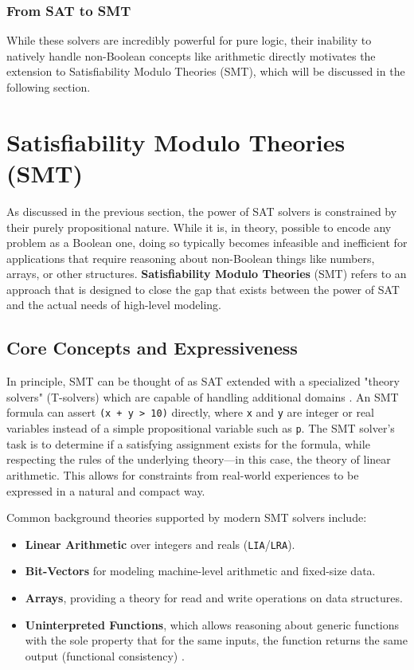 \documentclass[12pt, a4paper, oneside]{report} %
\begin{document}
\subsubsection{From SAT to SMT}
While these solvers are incredibly powerful for pure logic, their inability to natively handle non-Boolean concepts like arithmetic directly motivates the extension to Satisfiability Modulo Theories (SMT), which will be discussed in the following section.
\section{Satisfiability Modulo Theories (SMT)}
\label{sec:smt}

As discussed in the previous section, the power of SAT solvers is constrained by their purely propositional nature. While it is, in theory, possible to encode any problem as a Boolean one, doing so typically becomes infeasible and inefficient for applications that require reasoning about non-Boolean things like numbers, arrays, or other structures\cite{demoura2011smt}. \textbf{Satisfiability Modulo Theories} (SMT) refers to an approach that is designed to close the gap that exists between the power of SAT and the actual needs of high-level modeling.

\subsection{Core Concepts and Expressiveness}
In principle, SMT can be thought of as SAT extended with a specialized "theory solvers" (T-solvers) which are capable of handling additional domains \cite{Barrett2018_Handbook}. An SMT formula can assert \texttt{(x + y > 10)} directly, where \texttt{x} and \texttt{y} are integer or real variables instead of a simple propositional variable such as \texttt{p}. The SMT solver's task is to determine if a satisfying assignment exists for the formula, while respecting the rules of the underlying theory---in this case, the theory of linear arithmetic. This allows for constraints from real-world experiences to be expressed in a natural and compact way.

Common background theories supported by modern SMT solvers include:
\begin{itemize}
    \item \textbf{Linear Arithmetic} over integers and reals (\texttt{LIA}/\texttt{LRA}).
    \item \textbf{Bit-Vectors} for modeling machine-level arithmetic and fixed-size data.
    \item \textbf{Arrays}, providing a theory for read and write operations on data structures.
    \item \textbf{Uninterpreted Functions}, which allows reasoning about generic functions with the sole property that for the same inputs, the function returns the same output (functional consistency) \cite{Barrett2018_Handbook}.
\end{itemize}
\end{document}

